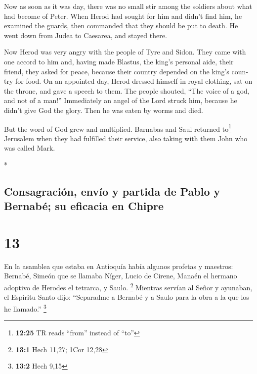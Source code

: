 \begin{paracol}{2}
\begin{otherlanguage}{english}
 Now as soon as it was day, there was no small stir among
the soldiers about what had become of Peter.  When Herod
had sought for him and didn't find him, he examined the guards, then
commanded that they should be put to death. He went down from Judea to
Caesarea, and stayed there.

 Now Herod was very angry with the people of Tyre and
Sidon. They came with one accord to him and, having made Blastus, the
king's personal aide, their friend, they asked for peace, because their
country depended on the king's country for food.  On an
appointed day, Herod dressed himself in royal clothing, sat on the
throne, and gave a speech to them.  The people shouted,
``The voice of a god, and not of a man!''  Immediately an
angel of the Lord struck him, because he didn't give God the glory. Then
he was eaten by worms and died.

 But the word of God grew and multiplied. 
Barnabas and Saul returned to\footnote{\textbf{12:25} TR reads ``from''
  instead of ``to''} Jerusalem when they had fulfilled their service,
also taking with them John who was called Mark.

\end{otherlanguage}

\switchcolumn[0]*

\hypertarget{consagraciuxf3n-envuxedo-y-partida-de-pablo-y-bernabuxe9-su-eficacia-en-chipre}{%
\subsection{Consagración, envío y partida de Pablo y Bernabé; su
eficacia en
Chipre}\label{consagraciuxf3n-envuxedo-y-partida-de-pablo-y-bernabuxe9-su-eficacia-en-chipre}}

\hypertarget{section-24}{%
\section{13}\label{section-24}}

 En la asamblea que estaba en Antioquía había algunos
profetas y maestros: Bernabé, Simeón que se llamaba Níger, Lucio de
Cirene, Manaén el hermano adoptivo de Herodes el tetrarca, y Saulo.
\footnote{\textbf{13:1} Hech 11,27; 1Cor 12,28}  Mientras
servían al Señor y ayunaban, el Espíritu Santo dijo: ``Separadme a
Bernabé y a Saulo para la obra a la que los he llamado.'' \footnote{\textbf{13:2}
  Hech 9,15}


\end{paracol}
